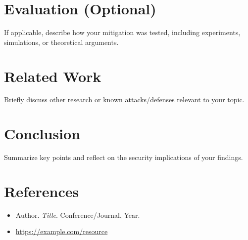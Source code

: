 \documentclass[11pt]{article}
\begin{document}
\section{Evaluation (Optional)}
If applicable, describe how your mitigation was tested, including experiments, simulations, or theoretical arguments.

\section{Related Work}
Briefly discuss other research or known attacks/defenses relevant to your topic.

\section{Conclusion}
Summarize key points and reflect on the security implications of your findings.

\section*{References}
\begin{itemize}
    \item Author. \textit{Title}. Conference/Journal, Year.
    \item \url{https://example.com/resource}
\end{itemize}
\end{document}

